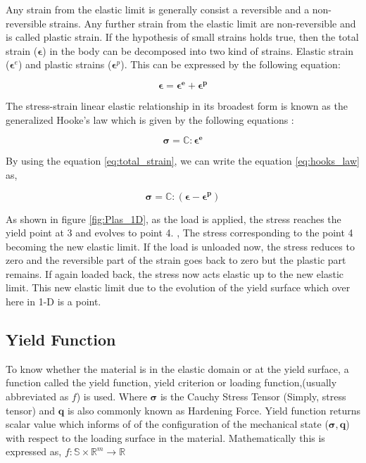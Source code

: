 Any strain from the elastic limit is generally consist a reversible and a  non-reversible strains. Any further strain from the elastic limit are non-reversible and is called plastic strain. If the hypothesis of small strains holds true, then the total strain ($\bm  \epsilon$) in the body can be decomposed into two kind of strains. Elastic strain ($\bm \epsilon^e$) and plastic strains ($\bm \epsilon^p$). This can be expressed by the following equation:

\begin{equation}
\bm{\epsilon = \epsilon^e + \epsilon^p} \label{eq:total_strain}
\end{equation}

The stress-strain linear elastic relationship  in its broadest form is known as the generalized Hooke’s law which is given by the following equations \cite{eduardo}:
	
\begin{equation}
\bm {\sigma}=\mathbb{C}:\bm{\epsilon^e} \label{eq:hooks_law}
\end{equation}

By using the equation \ref{eq:total_strain}, we can write the equation \ref{eq:hooks_law} as,

\begin{equation}
\bm {\sigma} = \mathbb{C}:(\bm {\epsilon - \epsilon^p}) \label{eq:hooks_law_plastic}
\end{equation}

 As shown in figure \ref{fig:Plas_1D}, as the load is applied, the stress reaches the yield point at 3 and evolves to point 4. , The stress corresponding to the point 4 becoming the new elastic limit. If the load is unloaded now, the stress reduces to zero and the reversible part of the strain goes back to zero but the plastic part remains. If again loaded back, the stress now acts elastic up to the new elastic limit. This new elastic limit due to the evolution of the yield surface which over here in 1-D is a point. 
 
 \subsection*{Yield Function}
 
 
 
 To know whether the material is in the elastic domain or at the yield surface, a function called the yield function, yield criterion or loading function,(usually abbreviated as $f$) is used. Where $\bm\sigma$ is the Cauchy Stress Tensor (Simply, stress tensor) and $\bm q$ is also commonly known as Hardening Force. Yield function returns scalar value which informs of of the configuration of the mechanical state ($\bm\sigma, \bm q$) with respect to the loading surface in the material. Mathematically this is expressed as, $f:\mathbb{S} \times \mathbb{R}^m \rightarrow \mathbb{R}$ \cite{simo}
 
